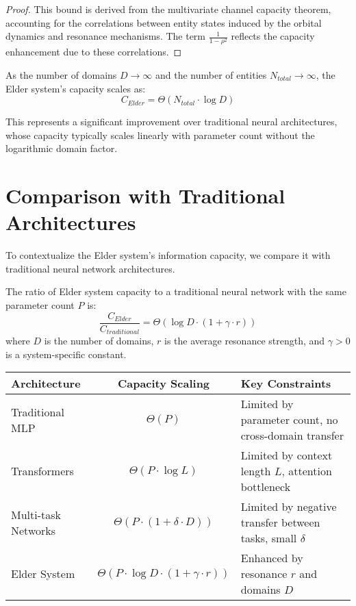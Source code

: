 \begin{proof}
This bound is derived from the multivariate channel capacity theorem, accounting for the correlations between entity states induced by the orbital dynamics and resonance mechanisms. The term $\frac{1}{1 - \rho^2}$ reflects the capacity enhancement due to these correlations.
\end{proof}

\begin{corollary}
As the number of domains $D \to \infty$ and the number of entities $N_{total} \to \infty$, the Elder system's capacity scales as:
\begin{equation}
C_{Elder} = \Theta\left(N_{total} \cdot \log D\right)
\end{equation}
\end{corollary}

This represents a significant improvement over traditional neural architectures, whose capacity typically scales linearly with parameter count without the logarithmic domain factor.

\section{Comparison with Traditional Architectures}

To contextualize the Elder system's information capacity, we compare it with traditional neural network architectures.

\begin{theorem}
The ratio of Elder system capacity to a traditional neural network with the same parameter count $P$ is:
\begin{equation}
\frac{C_{Elder}}{C_{traditional}} = \Theta\left(\log D \cdot (1 + \gamma \cdot r)\right)
\end{equation}
where $D$ is the number of domains, $r$ is the average resonance strength, and $\gamma > 0$ is a system-specific constant.
\end{theorem}

\begin{tabular}{|l|c|p{8cm}|}
\hline
\textbf{Architecture} & \textbf{Capacity Scaling} & \textbf{Key Constraints} \\
\hline
Traditional MLP & $\Theta(P)$ & Limited by parameter count, no cross-domain transfer \\
\hline
Transformers & $\Theta(P \cdot \log L)$ & Limited by context length $L$, attention bottleneck \\
\hline
Multi-task Networks & $\Theta(P \cdot (1 + \delta \cdot D))$ & Limited by negative transfer between tasks, small $\delta$ \\
\hline
Elder System & $\Theta(P \cdot \log D \cdot (1 + \gamma \cdot r))$ & Enhanced by resonance $r$ and domains $D$ \\
\hline
\end{tabular}

